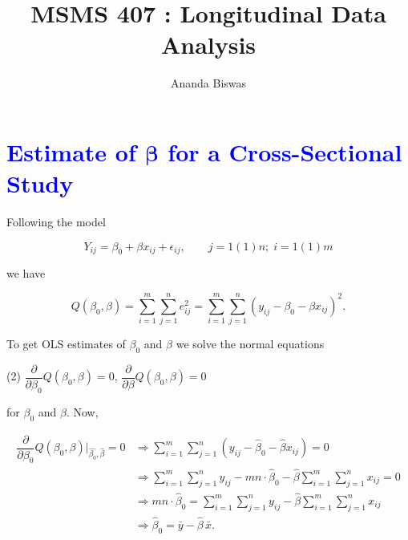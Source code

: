\documentclass[11pt, a4paper]{article}
\title{MSMS 407 : Longitudinal Data Analysis}
\author{{\fontsize{25}{20} \benyorithafont Ananda Biswas}}
\date{}
\begin{document}
\maketitle

\section*{\faArrowAltCircleRight[regular] \textcolor{blue}{Estimate of $\boldsymbol{\beta}$ for a Cross-Sectional Study}}

Following the model

\begin{equation}
Y_{ij} = \beta_0 + \beta x_{ij} + \epsilon_{ij}, \qquad j = 1(1)n; \; i = 1(1)m
\end{equation}

we have

\begin{equation}
Q(\beta_0, \beta) = \sum \limits_{i=1}^{m} \sum \limits_{j=1}^{n} e_{ij}^2 = \sum \limits_{i=1}^{m} \sum \limits_{j=1}^{n} \left(y_{ij} - \beta_0 - \beta x_{ij} \right)^2.
\end{equation}

To get OLS estimates of $\beta_0$ and $\beta$ we solve the normal equations


\begin{tasks}(2)
\task $\dfrac{\partial}{\partial \beta_0} Q(\beta_0, \beta) = 0$,
\task $\dfrac{\partial}{\partial	\beta} Q(\beta_0, \beta) = 0$
\end{tasks}

for $\beta_0$ and $\beta$. Now,

\begin{align}
\dfrac{\partial}{\partial \beta_0} Q(\beta_0, \beta) \Bigg|_{\widehat{\beta_0}, \widehat{\beta}} = 0 
&\Rightarrow 
\sum \limits_{i=1}^{m} \sum \limits_{j=1}^{n}
\left(y_{ij} - \widehat{\beta}_0 - \widehat{\beta} x_{ij} \right) = 0 \nonumber \\[0.5em]
&\Rightarrow
\sum \limits_{i=1}^{m} \sum \limits_{j=1}^{n} y_{ij}
- mn \cdot \widehat{\beta}_0 - \widehat{\beta} \sum \limits_{i=1}^{m} \sum \limits_{j=1}^{n} x_{ij} = 0 \nonumber \\[0.5em]
&\Rightarrow
mn \cdot \widehat{\beta}_0 = \sum \limits_{i=1}^{m} \sum \limits_{j=1}^{n} y_{ij} - \widehat{\beta} \sum \limits_{i=1}^{m} \sum \limits_{j=1}^{n} x_{ij} \nonumber \\[0.5em]
&\Rightarrow \widehat{\beta}_0 = \bar{y} - \widehat{\beta}\,\bar{x}.
\end{align}
\end{document}
